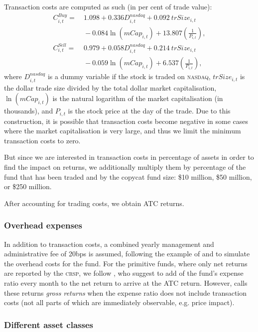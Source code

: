 \documentclass[12pt, a4]{article}
\begin{document}
Transaction costs are computed as such (in per cent of trade value):
\begin{align}
    C_{i,t}^{Buy} = &\ 1.098 + 0.336 D_{i,t}^{nasdaq} + 0.092 \ trSize_{i,t} \nonumber \\ 
    &\ - 0.084 \ln(mCap_{i, t}) + 13.807 \left( \frac {1}{P_{i, t}} \right), \\
    C_{i,t}^{Sell} = &\ 0.979 + 0.058 D_{i, t}^{nasdaq} + 0.214 \ trSize_{i,t} \nonumber \\
    &\ - 0.059 \ln (mCap_{i,t})+6.537\left(\frac {1}{P_{i,t}}\right),
\end{align}
where $D_{i,t}^{nasdaq}$ is a dummy variable if the stock is traded on \textsc{nasdaq}, $trSize_{i,t}$ is the dollar trade size divided by the total dollar market capitalisation, $\ln(mCap_{i,t})$ is the natural logarithm of the market capitalisation (in thousands), and $P_{i,t}$ is the stock price at the day of the trade. Due to this construction, it is possible that transaction costs become negative in some cases where the market capitalisation is very large, and thus we limit the minimum transaction costs to zero.

But since we are interested in transaction costs in percentage of assets in order to find the impact on returns, we additionally multiply them by percentage of the fund that has been traded and by the copycat fund size: \$10 million, \$50 million, or \$250 million.

After accounting for trading costs, we obtain \textsc{ATC} returns.

\subsubsection{Overhead expenses}

In addition to transaction costs, a combined yearly management and administrative fee of 20bps is assumed, following the example of \cite{frank} and \cite{verbeek} to simulate the overhead costs for the fund. For the primitive funds, where only net returns are reported by the \textsc{crsp}, we follow \cite{cohen}, who suggest to add  of the fund's expense ratio every month to the net return to arrive at the \textsc{ATC} return. However, \citeauthor{cohen} calls these returns \textit{gross returns} when the expense ratio does not include transaction costs (not all parts of which are immediately observable, e.g. price impact).

\subsubsection{Different asset classes}
\end{document}
